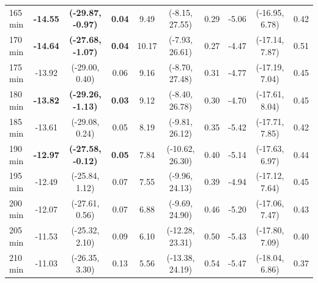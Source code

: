 \begin{table}[ht]
{\begin{tabular}{lccccccccc}
165 min & \textbf{-14.55} & \textbf{(-29.87, -0.97)} & \textbf{0.04} & 9.49 & (-8.15, 27.55) & 0.29 & -5.06 & (-16.95, 6.78) & 0.42 \\
170 min & \textbf{-14.64} & \textbf{(-27.68, -1.07)} & \textbf{0.04} & 10.17 & (-7.93, 26.61) & 0.27 & -4.47 & (-17.14, 7.87) & 0.51 \\
175 min & -13.92 & (-29.00, 0.40) & 0.06 & 9.16 & (-8.70, 27.48) & 0.31 & -4.77 & (-17.19, 7.04) & 0.45 \\
180 min & \textbf{-13.82} & \textbf{(-29.26, -1.13)} & \textbf{0.03} & 9.12 & (-8.40, 26.78) & 0.30 & -4.70 & (-17.61, 8.04) & 0.45 \\
185 min & -13.61 & (-29.08, 0.24) & 0.05 & 8.19 & (-9.81, 26.12) & 0.35 & -5.42 & (-17.71, 7.85) & 0.42 \\
190 min & \textbf{-12.97} & \textbf{(-27.58, -0.12)} & \textbf{0.05} & 7.84 & (-10.62, 26.30) & 0.40 & -5.14 & (-17.63, 6.97) & 0.44 \\
195 min & -12.49 & (-25.84, 1.12) & 0.07 & 7.55 & (-9.96, 24.13) & 0.39 & -4.94 & (-17.12, 7.64) & 0.45 \\
200 min & -12.07 & (-27.61, 0.56) & 0.07 & 6.88 & (-9.69, 24.90) & 0.46 & -5.20 & (-17.06, 7.47) & 0.43 \\
205 min & -11.53 & (-25.32, 2.10) & 0.09 & 6.10 & (-12.28, 23.31) & 0.50 & -5.43 & (-17.80, 7.09) & 0.40 \\
210 min & -11.03 & (-26.35, 3.30) & 0.13 & 5.56 & (-13.38, 24.19) & 0.54 & -5.47 & (-18.04, 6.86) & 0.37 \\
\bottomrule
\end{tabular}%
}
\end{table}
